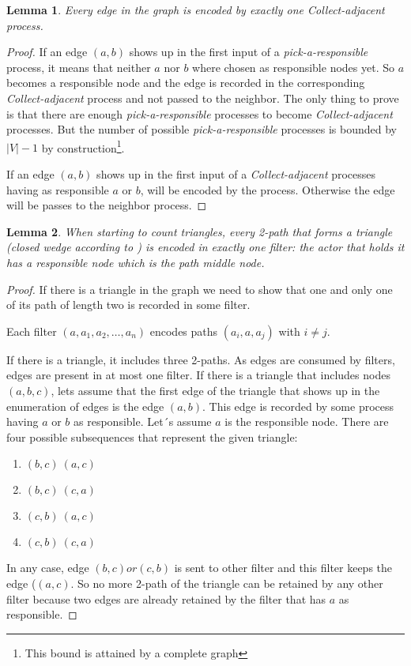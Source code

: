 \documentclass{article}                     \usepackage{graphics}
\newtheorem{lemma}{Lemma}
\begin{document}
\begin{lemma} Every edge in the graph is encoded by  exactly  one \textit{Collect-adjacent} process.
\end{lemma} 
\begin{proof}
If an edge $(a,b)$ shows up in the first input of  a \textit{pick-a-responsible} process, it means that  neither $a$ nor $b$ where chosen as responsible nodes yet. So $a$ becomes a responsible node and the edge is recorded in the corresponding \textit{Collect-adjacent}  process and not passed to the neighbor. The only thing to prove is that there are enough \textit{pick-a-responsible} processes to become  \textit{Collect-adjacent}  processes. But the number of possible  \textit{pick-a-responsible}  processes is bounded by $|V|-1$ by construction\footnote{This bound is attained by a complete graph}.

If an edge $(a,b)$ shows up in the first input of  a \textit{Collect-adjacent} processes having as responsible $a$ or $b$, will be encoded by the process. Otherwise the edge will be passes to the neighbor process.
\end{proof}
\begin{lemma}When starting to count triangles, every  2-path that forms a triangle (closed wedge according to \cite{DBLP:journals/corr/JhaSP13}) is encoded in exactly one filter: the actor that holds it has a responsible node  which  is the path middle node.
\end{lemma}
\begin{proof}
If there is a triangle in the graph we need to show that one and only one of its path of length two is recorded in some filter.

Each filter $(a, a_1,a_2,\hdots , a_n)$ encodes  paths  $(a_i,a,a_j)$ with $i \ne j$. 

If there is a triangle, it includes three  2-paths. As edges are consumed by  filters, edges are present in at most one filter.
If there is a triangle that includes nodes $(a,b,c)$, lets assume that the first edge of the triangle that shows up in the enumeration of edges is the edge $(a,b)$. This edge is recorded  by some process having $a$ or $b$ as responsible. Let´s assume $a$ is the responsible node.  There are four possible subsequences that represent the given triangle:

\begin{enumerate}
\item $(b,c)\   (a,c)$ 
\item $(b,c) \  (c,a)$
\item $(c,b) \ (a,c)$
\item  $(c,b) \ (c,a)$
\end{enumerate} 
In any case, edge $(b,c) or (c,b)$ is sent to other filter and this filter keeps the edge ($(a,c)$. So no more 2-path  of the triangle can be retained by any other filter because  two edges are already retained by the filter that has $a$ as responsible.
\end{proof}
\end{document}
